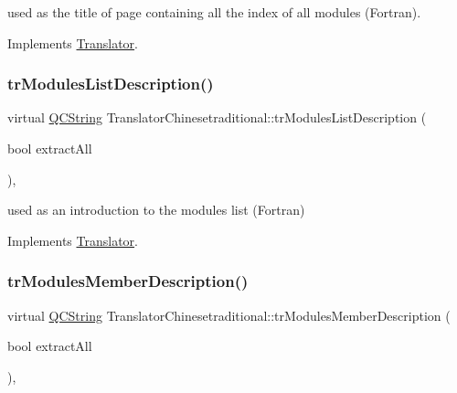 used as the title of page containing all the index of all modules (Fortran). 

Implements \mbox{\hyperlink{class_translator}{Translator}}.

\mbox{\label{class_translator_chinesetraditional_ab4c7704858f5c6b7d92b9a367c315b34}} 
\subsubsection{\texorpdfstring{trModulesListDescription()}{trModulesListDescription()}}
{\footnotesize\ttfamily virtual \mbox{\hyperlink{class_q_c_string}{Q\+C\+String}} Translator\+Chinesetraditional\+::tr\+Modules\+List\+Description (\begin{DoxyParamCaption}\item[{bool}]{extract\+All }\end{DoxyParamCaption})\hspace{0.3cm}{\ttfamily [inline]}, {\ttfamily [virtual]}}

used as an introduction to the modules list (Fortran) 

Implements \mbox{\hyperlink{class_translator}{Translator}}.

\mbox{\label{class_translator_chinesetraditional_a9bf54c19960f31410a7c1d3e06e71a95}} 
\subsubsection{\texorpdfstring{trModulesMemberDescription()}{trModulesMemberDescription()}}
{\footnotesize\ttfamily virtual \mbox{\hyperlink{class_q_c_string}{Q\+C\+String}} Translator\+Chinesetraditional\+::tr\+Modules\+Member\+Description (\begin{DoxyParamCaption}\item[{bool}]{extract\+All }\end{DoxyParamCaption})\hspace{0.3cm}{\ttfamily [inline]}, {\ttfamily [virtual]}}

